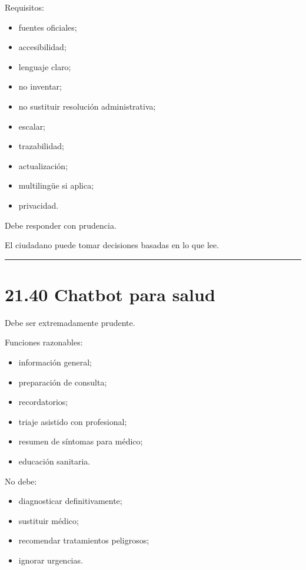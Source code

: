 Requisitos:

\begin{itemize}
\tightlist
\item
  fuentes oficiales;
\item
  accesibilidad;
\item
  lenguaje claro;
\item
  no inventar;
\item
  no sustituir resolución administrativa;
\item
  escalar;
\item
  trazabilidad;
\item
  actualización;
\item
  multilingüe si aplica;
\item
  privacidad.
\end{itemize}

Debe responder con prudencia.

El ciudadano puede tomar decisiones basadas en lo que lee.

\begin{center}\rule{0.5\linewidth}{0.5pt}\end{center}

\section{21.40 Chatbot para salud}\label{chatbot-para-salud}

Debe ser extremadamente prudente.

Funciones razonables:

\begin{itemize}
\tightlist
\item
  información general;
\item
  preparación de consulta;
\item
  recordatorios;
\item
  triaje asistido con profesional;
\item
  resumen de síntomas para médico;
\item
  educación sanitaria.
\end{itemize}

No debe:

\begin{itemize}
\tightlist
\item
  diagnosticar definitivamente;
\item
  sustituir médico;
\item
  recomendar tratamientos peligrosos;
\item
  ignorar urgencias.
\end{itemize}

